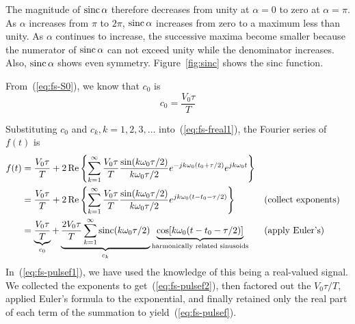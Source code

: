 The magnitude of $\operatorname{sinc}\alpha$ therefore decreases from unity at
$\alpha=0$ to zero at $\alpha=\pi$. As $\alpha$ increases from $\pi$
to $2\pi$, $\operatorname{sinc}\alpha$ increases from zero to a maximum less than
unity. As $\alpha$ continues to increase, the successive maxima become
smaller because the numerator of $\operatorname{sinc}\alpha$ can not exceed unity
while the denominator increases. Also, $\operatorname{sinc}\alpha$ shows even
symmetry. Figure~\ref{fig:sinc} shows the sinc function.

From~(\ref{eq:fs-S0}), we know that $c_0$ is 
\begin{equation}
c_0=\frac{V_0\tau}{T}
\end{equation}

Substituting $c_0$ and $c_k, k=1, 2,3,\ldots$
into~(\ref{eq:fs-freal1}), the Fourier series of $f(t)$ is
\begin{align}
f(t)&= \frac{V_0\tau}{T} +2\operatorname{Re}\left\{\sum_{k=1}^{\infty}
          \frac{V_0\tau}{T}
          \frac{\sin(k\omega_0\tau/2)}{k\omega_0\tau/2}
          e^{-jk\omega_0(t_0+\tau/2)}e^{jk\omega_0t}\right\} 
       \label{eq:fs-pulsef1}\\ 
    &= \frac{V_0\tau}{T}
       + 2\operatorname{Re}\left\{\sum_{k=1}^{\infty}\frac{V_0\tau}{T}
            \frac{\sin(k\omega_0\tau/2)}{k\omega_0\tau/2}
            e^{jk\omega_0(t-t_0-\tau/2)}\right\} && \text{(collect exponents)}
       \label{eq:fs-pulsef2}\\
    &= \underbrace{\frac{V_0\tau}{T}}_{c_0}
       + \underbrace{\frac{2V_0\tau}{T} \sum_{k=1}^{\infty}
           \operatorname{sinc}(k\omega_0\tau/2)}_{c_k}
           \underbrace{\cos[k\omega_0(t-t_0-\tau/2)]}_{\text{harmonically
               related sinusoids}} && \text{(apply Euler's)}
\label{eq:fs-pulsef}
\end{align}
In~(\ref{eq:fs-pulsef1}), we have used the knowledge of this being a
real-valued signal. We collected the exponents to
get~(\ref{eq:fs-pulsef2}), then factored out the $V_0\tau/T$, applied
Euler's formula to the exponential, and finally retained only the real
part of each term of the summation to yield~(\ref{eq:fs-pulsef}).


